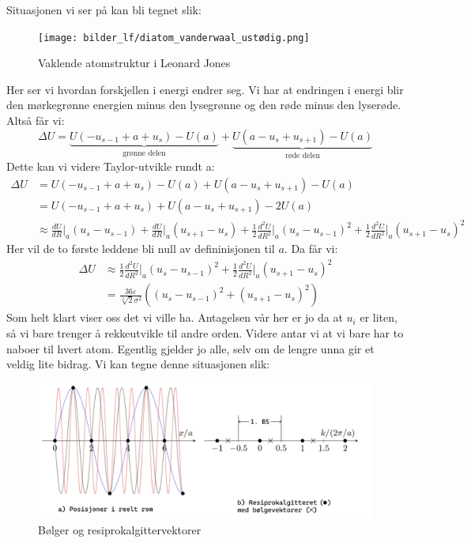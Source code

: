 \documentclass{article}
\begin{document}
Situasjonen vi ser på kan bli tegnet slik:
\begin{figure}[H]
    \centering
    \texttt{[image: bilder\_lf/diatom\_vanderwaal\_ustødig.png]}
    \caption{Vaklende atomstruktur i Leonard Jones}
    \label{fig:diatom_vanderwaal_ustødig}
\end{figure}
Her ser vi hvordan forskjellen i energi endrer seg. Vi har at endringen i energi blir den mørkegrønne energien minus den lysegrønne og den røde minus den lyserøde. Altså får vi:
\begin{equation}
    \Delta U = \underbrace{U(-u_{s-1} + a + u_s) - U(a)}_{\text{grønne delen}} +  \underbrace{U(a - u_s + u_{s+1}) - U(a)}_{\text{røde delen}}
\end{equation}
Dette kan vi videre Taylor-utvikle rundt a:
\begin{align}
     \Delta U &= U(-u_{s-1} + a + u_s) - U(a) +  U(a - u_s + u_{s+1}) - U(a) \\
     &= U(-u_{s-1} + a + u_s) +  U(a - u_s + u_{s+1}) - 2U(a) \\
     &\approx \frac{d U}{dR}\Bigg |_a (u_s - u_{s-1}) + \frac{d U}{dR}\Bigg |_a (u_{s+1}-u_s) + \frac{1}{2}\frac{d^2 U}{dR^2}\Bigg |_a (u_s - u_{s-1})^2 + \frac{1}{2}\frac{d^2 U}{dR^2}\Bigg |_a (u_{s+1}-u_s)^2
\end{align}
Her vil de to første leddene bli null av defininisjonen til $a$. Da får vi:
\begin{align}
    \Delta U &\approx \frac{1}{2}\frac{d^2 U}{dR^2}\Bigg |_a (u_s - u_{s-1})^2 + \frac{1}{2}\frac{d^2 U}{dR^2}\Bigg |_a (u_{s+1}-u_s)^2 \\
    &=\frac{36 \varepsilon}{\sqrt[3]{2} \sigma^2}\left((u_s - u_{s-1})^2 +(u_{s+1}-u_s)^2 \right)
\end{align}
Som helt klart viser oss det vi ville ha. Antagelsen vår her er jo da at $u_i$ er liten, så vi bare trenger å rekkeutvikle til andre orden. Videre antar vi at vi bare har to naboer til hvert atom. Egentlig gjelder jo alle, selv om de lengre unna gir et veldig lite bidrag.
Vi kan tegne denne situasjonen slik:
\begin{figure}[H]
    \centering
    \includegraphics[width=0.55\linewidth]{bilder_lf/bølger_og_impulser_og_posisjon_øving_5.png}
    \caption{Bølger og resiprokalgittervektorer}
    \label{fig:bølger_og_impulser_og_posisjon_øving_5}
\end{figure}
\end{document}
